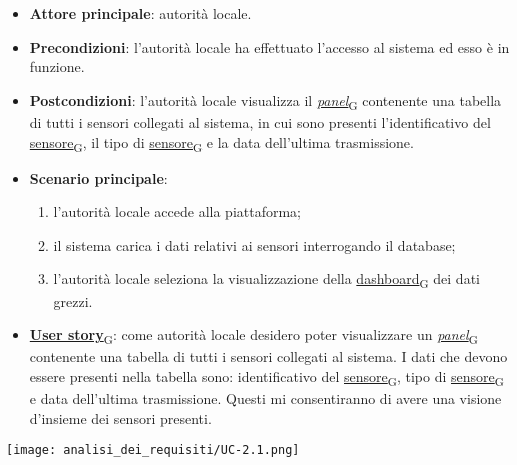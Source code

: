 \begin{itemize}
	\item \textbf{Attore principale}: autorità locale.
	\item \textbf{Precondizioni}: l'autorità locale ha effettuato l'accesso al sistema ed esso è in funzione.
	\item \textbf{Postcondizioni}: l'autorità locale visualizza il \href{https://7last.github.io/docs/pb/documentazione-interna/glossario\#panel}{\textit{panel}\textsubscript{G}} contenente una tabella di tutti i sensori collegati al sistema,
	      in cui sono presenti l'identificativo del \href{https://7last.github.io/docs/pb/documentazione-interna/glossario\#sensore}{sensore\textsubscript{G}}, il tipo di \href{https://7last.github.io/docs/pb/documentazione-interna/glossario\#sensore}{sensore\textsubscript{G}} e la data dell'ultima trasmissione.
	\item \textbf{Scenario principale}:
	      \begin{enumerate}
		      \item l'autorità locale accede alla piattaforma;
		      \item il sistema carica i dati relativi ai sensori interrogando il database;
		      \item l'autorità locale seleziona la visualizzazione della \href{https://7last.github.io/docs/pb/documentazione-interna/glossario\#dashboard}{dashboard\textsubscript{G}} dei dati grezzi.
	      \end{enumerate}
	\item \href{https://7last.github.io/docs/pb/documentazione-interna/glossario\#user-story}{\textbf{User story}\textsubscript{G}}: come autorità locale desidero poter visualizzare un \href{https://7last.github.io/docs/pb/documentazione-interna/glossario\#panel}{\textit{panel}\textsubscript{G}} contenente una tabella di tutti i sensori collegati al sistema. I dati che devono essere presenti nella tabella sono: identificativo del \href{https://7last.github.io/docs/pb/documentazione-interna/glossario\#sensore}{sensore\textsubscript{G}}, tipo di \href{https://7last.github.io/docs/pb/documentazione-interna/glossario\#sensore}{sensore\textsubscript{G}} e data dell'ultima trasmissione. Questi mi consentiranno di avere una visione d'insieme dei sensori presenti.
\end{itemize}
\begin{center}
	\texttt{[image: analisi\_dei\_requisiti/UC-2.1.png]}
\end{center}

